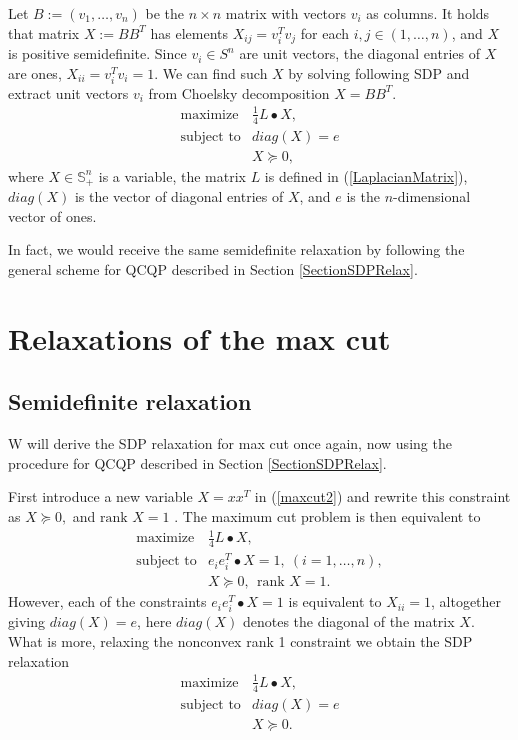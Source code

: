 \documentclass[12pt]{book}
\theoremstyle{definition}
\begin{document}
Let $B := (v_1,\dots ,v_n)$ be the $n\times n$ matrix with vectors $v_i$ as columns. 
It holds that matrix $X:= BB^T$ has elements $ X_{ij} = v_i^Tv_j $ for each $i,j\in (1,\dots,n)$, and $X$ is positive semidefinite.
Since $v_i\in S^n$ are unit vectors, the diagonal entries of $X$ are ones, $X_{ii} = v_i^Tv_i = 1$.
We can find such $X$ by solving following SDP and extract unit vectors $v_i$ from Choelsky decomposition $X = BB^T$.
\begin{equation}
\label{maxcutRelax2}
\begin{array}{ll}
\mbox{maximize} & \frac{1}{4}L\bullet X, \\
\mbox{subject to} & diag(X) = e \\
&	X\succeq 0,
\end{array}
\end{equation} 
where $X\in\mathbb{S}^n_+$ is a variable, the matrix $L$ is defined in (\ref{LaplacianMatrix}), $diag(X)$ is the vector of diagonal entries of $X$, and $e$ is the $n$-dimensional vector of ones.

\rem In fact, we would receive the same semidefinite relaxation by following the general scheme for QCQP described in Section \ref{SectionSDPRelax}.


\section{Relaxations of the max cut}



\subsection{Semidefinite relaxation}
W will derive the SDP relaxation for max cut once again, now using the procedure for QCQP described in Section \ref{SectionSDPRelax}.

First introduce a new variable $X = xx^T$ in (\ref{maxcut2})  and rewrite this constraint as $X\succeq 0,$ and $\mbox{rank }X = 1$ . The maximum cut problem is then equivalent to 
\begin{equation}
\label{maxcutstandardSDPstep1}
\begin{array}{ll}
\mbox{maximize} & \frac{1}{4}L\bullet X, \\
\mbox{subject to} & e_ie_i^T\bullet X = 1, \ (i = 1,\dots ,n), \\
				&	X\succeq 0, \ \ \mbox{rank }X = 1.
\end{array}
\end{equation}
However, each of the constraints $e_ie_i^T\bullet X = 1$ is equivalent to $X_{ii} = 1$, altogether giving $diag(X) = e$, here $diag(X)$ denotes the diagonal of the matrix $X$.
What is more, relaxing the nonconvex rank 1 constraint we obtain the SDP relaxation 
\begin{equation}
\label{MaxCutSDPRelax}
\begin{array}{ll}
\mbox{maximize} & \frac{1}{4}L\bullet X, \\
\mbox{subject to} & diag(X) = e \\
&	X\succeq 0.
\end{array}
\end{equation} 
\end{document}
